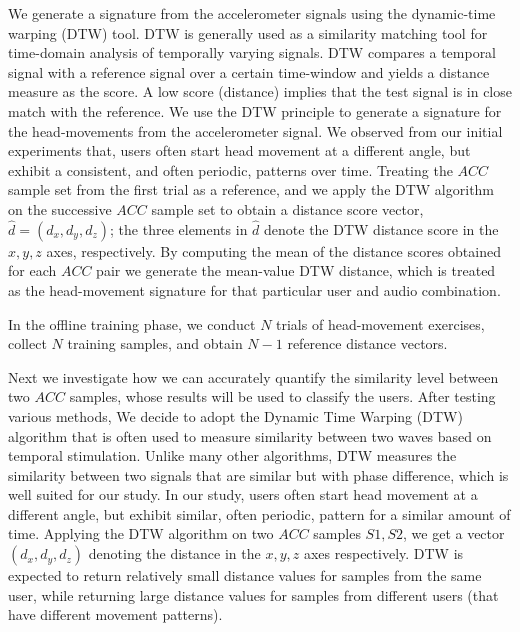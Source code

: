 We generate a signature from the accelerometer signals using the
dynamic-time warping (DTW) tool. DTW is generally used
as a similarity matching tool for time-domain analysis of
temporally varying signals.
DTW compares a temporal signal with a reference signal over a certain
time-window and yields a distance measure as the score. A low score (distance)
implies that the test signal is in close match with the reference.
We use the DTW principle to generate a signature for the head-movements
from the accelerometer signal.
We observed from our initial experiments that, users often
start head movement at a different angle,
but exhibit a consistent, and often periodic, patterns over time.
Treating the $ACC$ sample set from the first trial as a reference, and we
apply the DTW algorithm on the successive $ACC$ sample set to obtain a
distance score vector, $\hat{d} = (d_x, d_y, d_z)$; the three elements in
$\hat{d}$ denote the DTW distance score in the $x, y, z$ axes, respectively.
By computing the mean of the distance scores obtained for each $ACC$
pair we generate the mean-value DTW distance, which is treated as the
head-movement signature for that particular user and audio
combination.

In the offline training phase, we conduct 
$N$ trials of head-movement exercises, collect $N$ training samples, and obtain $N-1$ reference distance
vectors. %

\iffalse
Next we investigate how we can accurately quantify the similarity level
between two $ACC$ samples, whose results will be used to classify the users.
After testing various methods,
We decide to adopt the Dynamic Time Warping (DTW) algorithm that is
often used to measure similarity between two waves based on temporal
stimulation.  Unlike many other algorithms, DTW measures the similarity
between two signals that are similar but with phase difference, which is well
suited for our study. In our study, users often start head movement at a
different angle, but exhibit similar, often periodic, pattern for a similar
amount of time. Applying the DTW algorithm on two $ACC$ samples $S1, S2$, we
get a vector $(d_x, d_y, d_z)$ denoting the distance in the $x, y, z$ axes
respectively. DTW is expected to return relatively small distance values for
samples from the same user, while returning large distance values for samples
from different users (that have different movement patterns).


